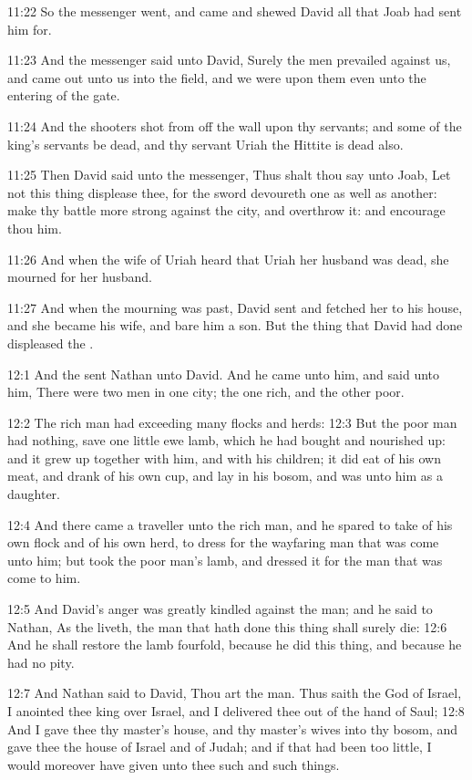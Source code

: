 11:22 So the messenger went, and came and shewed David all that Joab had sent him for.

11:23 And the messenger said unto David, Surely the men prevailed against us, and came out unto us into the field, and we were upon them even unto the entering of the gate.

11:24 And the shooters shot from off the wall upon thy servants; and some of the king's servants be dead, and thy servant Uriah the Hittite is dead also.

11:25 Then David said unto the messenger, Thus shalt thou say unto Joab, Let not this thing displease thee, for the sword devoureth one as well as another: make thy battle more strong against the city, and overthrow it: and encourage thou him.

11:26 And when the wife of Uriah heard that Uriah her husband was dead, she mourned for her husband.

11:27 And when the mourning was past, David sent and fetched her to his house, and she became his wife, and bare him a son. But the thing that David had done displeased the \LORD.

12:1 And the \LORD sent Nathan unto David. And he came unto him, and said unto him, There were two men in one city; the one rich, and the other poor.

12:2 The rich man had exceeding many flocks and herds: 12:3 But the poor man had nothing, save one little ewe lamb, which he had bought and nourished up: and it grew up together with him, and with his children; it did eat of his own meat, and drank of his own cup, and lay in his bosom, and was unto him as a daughter.

12:4 And there came a traveller unto the rich man, and he spared to take of his own flock and of his own herd, to dress for the wayfaring man that was come unto him; but took the poor man's lamb, and dressed it for the man that was come to him.

12:5 And David's anger was greatly kindled against the man; and he said to Nathan, As the \LORD liveth, the man that hath done this thing shall surely die: 12:6 And he shall restore the lamb fourfold, because he did this thing, and because he had no pity.

12:7 And Nathan said to David, Thou art the man. Thus saith the \LORD God of Israel, I anointed thee king over Israel, and I delivered thee out of the hand of Saul; 12:8 And I gave thee thy master's house, and thy master's wives into thy bosom, and gave thee the house of Israel and of Judah; and if that had been too little, I would moreover have given unto thee such and such things.

